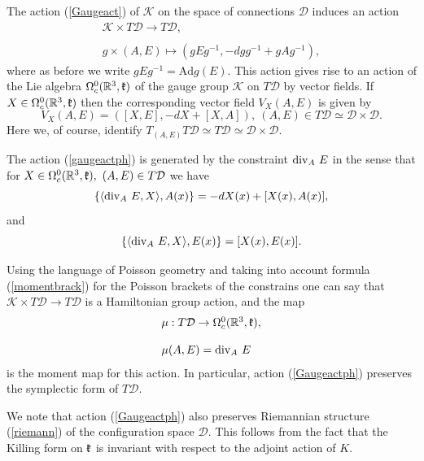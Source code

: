 \documentclass{amsart}
\begin{document}
The action (\ref{Gaugeact}) of $\mathcal{K}$ on the space of connections
$\mathcal{D}$ induces an action
\begin{equation}\label{Gaugeactph}
\begin{array}{l}
\mathcal{K}\times T\mathcal{D}\rightarrow T\mathcal{D}, \\
\\
g\times (A,E) \mapsto (gEg^{-1},-dgg^{-1}+gAg^{-1}),
\end{array}
\end{equation}
where as before we write $gEg^{-1}=\mathrm{Ad}g(E)$. This action gives rise
to an action of the Lie algebra $\Omega^0_c(\mathbb{R}^{3},\mathfrak k)$ of the gauge
group $\mathcal{K}$ on $T\mathcal{D}$ by vector fields. If $X\in \Omega^0_c(\mathbb{R}^{3},\mathfrak k)$
then the corresponding vector field $V_X(A,E)$ is given by
\begin{equation}\label{gaugeactph}
V_X(A,E)=([X,E],-dX+[X,A]),~(A,E)\in T\mathcal{D}\simeq \mathcal{D}\times \mathcal{D}.
\end{equation}
Here we, of course, identify
$T_{(A,E)}T\mathcal{D}\simeq T\mathcal{D}\simeq\mathcal{D}\times \mathcal{D}$.

The action (\ref{gaugeactph}) is generated by the constraint ${\rm div}_A~E$ in the sense that
for $X\in \Omega^0_c(\mathbb{R}^{3},\mathfrak k),~(A,E)\in T\mathcal{D}$ we have
$$
\{\langle {\rm div}_A~E,X\rangle ,A(x)\}=-dX(x)+[X(x),A(x)],
$$
and
$$
\{\langle {\rm div}_A~E,X\rangle ,E(x)\}=[X(x),E(x)].
$$

Using the language of Poisson geometry and taking into account formula (\ref{momentbrack})
for the Poisson brackets of the constrains one can say that
$\mathcal{K}\times T\mathcal{D}\rightarrow T\mathcal{D}$ is a Hamiltonian
group action, and the map
\begin{equation}\label{YMmoment}
\begin{array}{l}
\mu:T\mathcal{D}\rightarrow \Omega^0_c(\mathbb{R}^{3},\mathfrak k),\\
\\
\mu(A,E)={\rm div}_A~E
\end{array}
\end{equation}
is the moment map for this action. In particular, action (\ref{Gaugeactph})
preserves the symplectic form of $T\mathcal{D}$.

We note that action
(\ref{Gaugeactph}) also preserves Riemannian structure (\ref{riemann}) of the configuration
space $\mathcal{D}$.
This follows from the fact that the Killing form on $\mathfrak k$ is
invariant with respect to the adjoint action of $K$.
\end{document}
